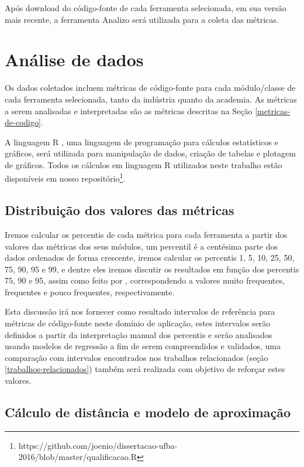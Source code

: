 Após download do código-fonte de cada ferramenta selecionada, em sua versão
mais recente, a ferramenta Analizo será utilizada para a coleta das métricas. 

\section{Análise de dados} \label{analise}

Os dados coletados incluem métricas de código-fonte para cada módulo/classe de
cada ferramenta selecionada, tanto da indústria quanto da academia. As
métricas a serem analisadas e interpretadas são as métricas descritas na Seção
\ref{metricas-de-codigo}.

A linguagem R \cite{Ihaka1996}, uma linguagem de programação para cálculos
estatísticos e gráficos, será utilizada para manipulação de dados, criação de
tabelas e plotagem de gráficos. Todos os cálculos em linguagem R utilizados
neste trabalho estão disponíveis
em nosso repositório\footnote{https://github.com/joenio/dissertacao-ufba-2016/blob/master/qualificacao.R}.

\subsection{Distribuição dos valores das métricas}

Iremos calcular os percentis de cada métrica para cada ferramenta a partir dos
valores das métricas dos seus módulos, um percentil é a centésima parte dos
dados ordenados de forma crescente, iremos calcular os percentis 1, 5, 10, 25,
50, 75, 90, 95 e 99, e dentre eles iremos discutir os resultados em função dos
percentis 75, 90 e 95, assim como feito por ,
correspondendo a valores muito frequentes, frequentes e pouco frequentes,
respectivamente.

Esta discussão irá nos fornecer como resultado intervalos de referência para
métricas de código-fonte neste domínio de aplicação, estes intervalos serão
definidos a partir da interpretação manual dos percentis e serão analisados
usando modelos de regressão a fim de serem compreendidos e validados, uma
comparação com intervalos encontrados nos trabalhos relacionados (seção
\ref{trabalhos-relacionados}) também será realizada com objetivo de reforçar
estes valores.

\subsection{Cálculo de distância e modelo de aproximação} \label{distancia}

